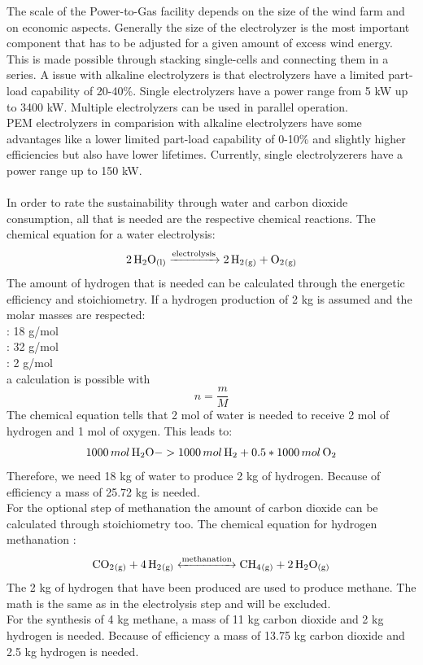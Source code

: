 \documentclass[11pt,a4paper]{article}
\begin{document}
\begin{parcolumns}[colwidths={1=2.5 cm, 2=10 cm, 3=2.5 cm}]{3}
{The scale of the Power-to-Gas facility depends on the size of the wind farm and on economic aspects. Generally the size of the electrolyzer is the most important component that has to be adjusted for a given amount of excess wind energy. \\
This is made possible through stacking single-cells and connecting them in a series. A issue with alkaline electrolyzers is that electrolyzers have a limited part-load capability of 20-40\%. Single electrolyzers have a power range from 5 kW up to 3400 kW. Multiple electrolyzers can be used in parallel operation. 
\\
PEM electrolyzers in comparision with alkaline electrolyzers have some advantages like a lower limited part-load capability of 0-10\% and slightly higher efficiencies but also have lower lifetimes. Currently, single electrolyzerers have a power range up to 150 kW. 
\\ \\
In order to rate the sustainability through water and carbon dioxide consumption, all that is needed are the respective chemical reactions. The chemical equation for a water electrolysis: \\
\[\ce{2H2O_{(l)}  ->[\text{electrolysis}] 2H2_{(g)} + O2_{(g)}}\]
The amount of hydrogen that is needed can be calculated through the energetic efficiency and stoichiometry.
If a hydrogen production of 2 kg is assumed and the molar masses are respected: \\
 : 18 g/mol \\
 : 32 g/mol \\
 : 2 g/mol \\
a calculation is possible with \[ n = \dfrac{m}{M} \] The chemical equation tells that 2 mol of water is needed to receive 2 mol of hydrogen and 1 mol of oxygen. This leads to:
\[ 1000 \, mol \, \ce{H2O} -> 1000 \,  mol \,  \ce{H2} + 0.5*1000 \, mol \, \ce{O2} \]
Therefore, we need 18 kg of water to produce 2 kg of hydrogen. Because of efficiency a mass of 25.72 kg is needed. \\
For the optional step of methanation the amount of carbon dioxide can be calculated through stoichiometry too.
The chemical equation for hydrogen methanation :
\[\ce{CO2_{(g)} +  4H2_{(g)} <->[\text{methanation}]  CH4_{(g)} + 2H2O_{(g)}}\] 
The 2 kg of hydrogen that have been produced are used to produce methane. The math is the same as in the electrolysis step and will be excluded. \\
For the synthesis of 4 kg methane, a mass of 11 kg carbon dioxide and 2 kg hydrogen is needed. Because of efficiency a mass of 13.75 kg carbon dioxide and 2.5 kg hydrogen is needed.
}
\end{parcolumns}
\end{document}
